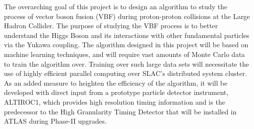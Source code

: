 \documentclass[paper=a4,fontsize=12pt]{article}
\begin{document}
The overarching goal of this project is to design an algorithm to study the process of vector boson fusion (VBF) during proton-proton collisions at the Large Hadron Collider. The purpose of studying the VBF process is to better understand the Higgs Boson and its interactions with other fundamental particles via the Yukawa coupling. The algorithm designed in this project will be based on machine learning techniques, and will require vast amounts of Monte Carlo data to train the algorithm over. Training over such large data sets will necessitate the use of highly efficient parallel computing over SLAC's distributed system cluster. As an added measure to heighten the efficiency of the algorithm, it will be developed with direct input from a prototype particle detector instrument, ALTIROC1, which provides high resolution timing information and is the predecessor to the High Granularity Timing Detector that will be installed in ATLAS during Phase-II upgrades.
\end{document}
